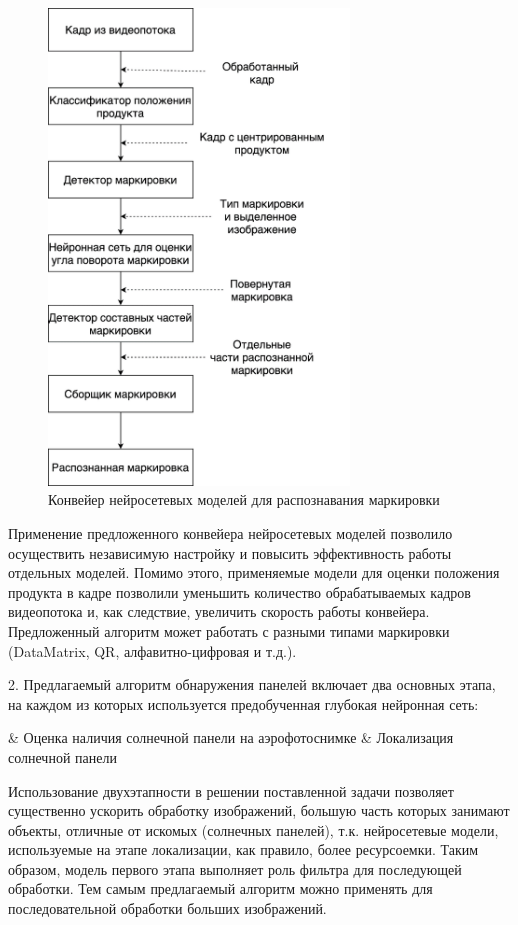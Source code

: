 \documentclass{thesisby}
\begin{document}
\begin{figure}[ht]
	\centering
	\includegraphics[width=8cm]{man-source/images/1_5.png}
	\caption{Конвейер нейросетевых моделей для распознавания маркировки}
	\label{fig:general_diagram}
\end{figure}

Применение предложенного конвейера нейросетевых моделей позволило осуществить независимую настройку и повысить эффективность работы отдельных моделей. Помимо этого, применяемые модели для оценки положения продукта в кадре позволили уменьшить количество обрабатываемых кадров видеопотока и, как следствие, увеличить скорость работы конвейера. Предложенный алгоритм может работать с разными типами маркировки (DataMatrix, QR, алфавитно-цифровая и т.д.).
	
2. Предлагаемый алгоритм обнаружения панелей включает два основных этапа, на каждом из которых используется предобученная глубокая нейронная сеть:

\begin{easylistNum}
    & Оценка наличия солнечной панели на аэрофотоснимке
    & Локализация солнечной панели
\end{easylistNum}

Использование двухэтапности в решении поставленной задачи позволяет существенно ускорить обработку изображений, большую часть которых занимают объекты, отличные от искомых (солнечных панелей), т.к. нейросетевые модели, используемые на этапе локализации, как правило, более ресурсоемки. Таким образом, модель первого этапа выполняет роль фильтра для последующей обработки. Тем самым предлагаемый алгоритм можно применять для последовательной обработки больших изображений.
\end{document}
